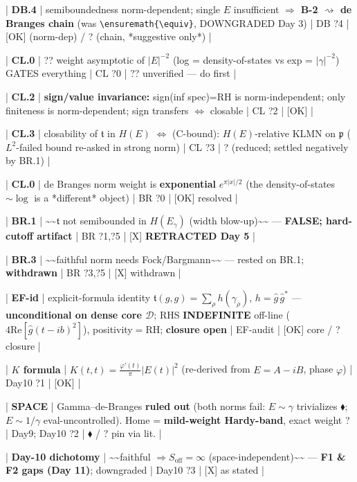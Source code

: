 \documentclass[10pt]{article}
\begin{document}
| \textbf{DB.4} | semiboundedness norm-dependent; single $E$ insufficient \ensuremath{\Rightarrow} \textbf{B-2 $\rightsquigarrow$ de Branges chain} (was \texttt{\textbackslash{}ensuremath\{\textbackslash{}equiv\}}, DOWNGRADED Day 3) | DB ?4 | [OK] (norm-dep) / ? (chain, *suggestive only*) |\par
| \textbf{CL.0} | ?? weight asymptotic of $|E|^{-2}$ (log = density-of-states vs exp = $|\gamma|^{-2}$) GATES everything | CL ?0 | ?? unverified --- do first |\par
| \textbf{CL.2} | \textbf{sign/value invariance:} sign(inf spec)=RH is norm-independent; only finiteness is norm-dependent; sign transfers $\iff$ closable | CL ?2 | [OK] |\par
| \textbf{CL.3} | closability of $\mathfrak t$ in $H(E)$ $\iff$ (C-bound): $H(E)$-relative KLMN on $\mathfrak p$ ($L^2$-failed bound re-asked in strong norm) | CL ?3 | ? (reduced; settled negatively by BR.1) |\par
| \textbf{CL.0} | de Branges norm weight is \textbf{exponential} $e^{\pi|x|/2}$ (the density-of-states $\sim\log$ is a *different* object) | BR ?0 | [OK] resolved |\par
| \textbf{BR.1} | \textasciitilde{}\textasciitilde{}$\mathfrak t$ not semibounded in $H(E_\gamma)$ (width blow-up)\textasciitilde{}\textasciitilde{} --- \textbf{FALSE; hard-cutoff artifact} | BR ?1,?5 | [X] \textbf{RETRACTED Day 5} |\par
| \textbf{BR.3} | \textasciitilde{}\textasciitilde{}faithful norm needs Fock/Bargmann\textasciitilde{}\textasciitilde{} --- rested on BR.1; \textbf{withdrawn} | BR ?3,?5 | [X] withdrawn |\par
| \textbf{EF-id} | explicit-formula identity $\mathfrak t(g,g)=\sum_\rho h(\gamma_\rho)$, $h=\widehat g\,\widehat g^*$ --- \textbf{unconditional on dense core $\mathcal D$}; RHS \textbf{INDEFINITE} off-line ($4\mathrm{Re}[\widehat g(t-ib)^2]$), positivity$=$RH; \textbf{closure open} | EF-audit | [OK] core / ? closure |\par
| \textbf{$K$ formula} | $K(t,t)=\tfrac{\varphi'(t)}\pi|E(t)|^2$ (re-derived from $E=A-iB$, phase $\varphi$) | Day10 ?1 | [OK] |\par
| \textbf{SPACE} | Gamma--de-Branges \textbf{ruled out} (both norms fail: $E\sim\gamma$ trivializes $\blacklozenge$; $E\sim1/\gamma$ eval-uncontrolled). Home = \textbf{mild-weight Hardy-band}, exact weight ? | Day9; Day10 ?2 | $\blacklozenge$ / ? pin via lit. |\par
| \textbf{Day-10 dichotomy} | \textasciitilde{}\textasciitilde{}faithful $\Rightarrow S_{\mathrm{off}}=\infty$ (space-independent)\textasciitilde{}\textasciitilde{} --- \textbf{F1 \& F2 gaps (Day 11)}; downgraded | Day10 ?3 | [X] as stated |\par
\end{document}

